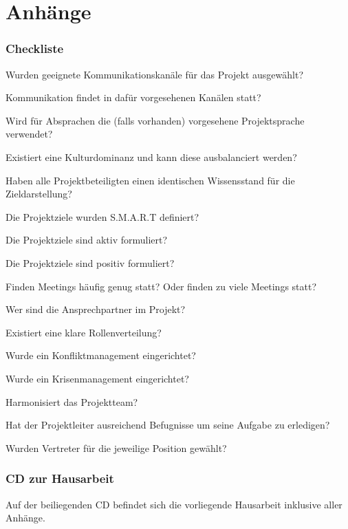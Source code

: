 \documentclass[12pt]{scrartcl}
\newcommand*{\thecheckbox}{\hss$\Box$}
\newenvironment*{checklist} 
{\list{}{%
\renewcommand*{\makelabel}[1]{\thecheckbox}}} 
{\endlist}
\begin{document}
\pagebreak
\thispagestyle{empty}

\pagebreak
\appendix
\part{Anhänge}
\thispagestyle{empty}
\section*{Checkliste}
\begin{checklist} 
\item Wurden geeignete Kommunikationskanäle für das Projekt ausgewählt? 
\item Kommunikation findet in dafür vorgesehenen Kanälen statt?
\item Wird für Absprachen die (falls vorhanden) vorgesehene Projektsprache verwendet?
\item Existiert eine Kulturdominanz und kann diese ausbalanciert werden?
\item Haben alle Projektbeteiligten einen identischen Wissensstand für die Zieldarstellung?
\item Die Projektziele wurden S.M.A.R.T definiert?
\item Die Projektziele sind aktiv formuliert?
\item Die Projektziele sind positiv formuliert?
\item Finden Meetings häufig genug statt? Oder finden zu viele Meetings statt?
\item Wer sind die Ansprechpartner im Projekt? 
\item Existiert eine klare Rollenverteilung?
\item Wurde ein Konfliktmanagement eingerichtet?
\item Wurde ein Krisenmanagement eingerichtet?
\item Harmonisiert das Projektteam? 
\item Hat der Projektleiter ausreichend Befugnisse um seine Aufgabe zu erledigen?
\item Wurden Vertreter für die jeweilige Position gewählt?
\end{checklist} 

\pagebreak
\thispagestyle{empty}
\section*{CD zur Hausarbeit}
Auf der beiliegenden CD befindet sich die vorliegende Hausarbeit inklusive aller Anhänge.
%
%
%
%
%
\end{document}
